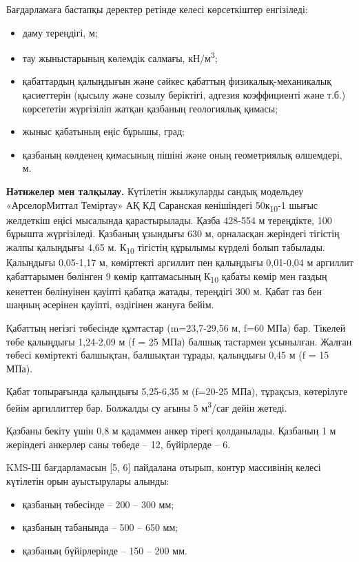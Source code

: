 \begin{multicols}{2}
Бағдарламаға бастапқы деректер ретінде келесі көрсеткіштер енгізіледі:

\begin{itemize}
\item
  даму тереңдігі, м;
\item
  тау жыныстарының көлемдік салмағы, кН/м\textsuperscript{3};
\item
  қабаттардың қалыңдығын және сәйкес қабаттың физикалық-механикалық
  қасиеттерін (қысылу және созылу беріктігі, адгезия коэффициенті және
  т.б.) көрсететін жүргізіліп жатқан қазбаның геологиялық қимасы;
\item
  жыныс қабатының еңіс бұрышы, град;
\item
  қазбаның көлденең қимасының пішіні және оның геометриялық өлшемдері,
  м.
\end{itemize}

{\bfseries Нәтижелер мен талқылау.} Күтілетін жылжуларды сандық модельдеу
«АрселорМиттал Теміртау» АҚ КД Саранская кенішіндегі
50к\textsubscript{10}-1 шығыс желдеткіш еңісі мысалында қарастырылады.
Қазба 428-554 м тереңдікте, 100 бұрышта жүргізіледі. Қазбаның ұзындығы
630 м, орналасқан жеріндегі тігістің жалпы қалыңдығы 4,65 м.
К\textsubscript{10} тігістің құрылымы күрделі болып табылады. Қалыңдығы
0,05-1,17 м, көміртекті аргиллит пен қалыңдығы 0,01-0,04 м аргиллит
қабаттарымен бөлінген 9 көмір қаптамасының К\textsubscript{10} қабаты
көмір мен газдың кенеттен бөлінуінен қауіпті қабатқа жатады, тереңдігі
300 м. Қабат газ бен шаңның әсерінен қауіпті, өздігінен жануға бейім.

Қабаттың негізгі төбесінде құмтастар (m=23,7-29,56 м, f=60 МПа) бар.
Тікелей төбе қалыңдығы 1,24-2,09 м (f = 25 МПа) балшық тастармен
ұсынылған. Жалған төбесі көміртекті балшықтан, балшықтан тұрады,
қалыңдығы 0,45 м (f = 15 МПа).

Қабат топырағында қалыңдығы 5,25-6,35 м (f=20-25 МПа), тұрақсыз,
көтерілуге бейім аргиллиттер бар. Болжалды су ағыны 5
м\textsuperscript{3}/сағ дейін жетеді.

Қазбаны бекіту үшін 0,8 м қадаммен анкер тірегі қолданылады. Қазбаның 1
м жеріндегі анкерлер саны төбеде -- 12, бүйірлерде -- 6.

KMS-Ш бағдарламасын {[}5, 6{]} пайдалана отырып, контур массивінің
келесі күтілетін орын ауыстырулары алынды:

\begin{itemize}
\item
  қазбаның төбесінде -- 200 -- 300 мм;
\item
  қазбаның табанында -- 500 -- 650 мм;
\item
  қазбаның бүйірлерінде -- 150 -- 200 мм.
\end{itemize}


\end{multicols}
